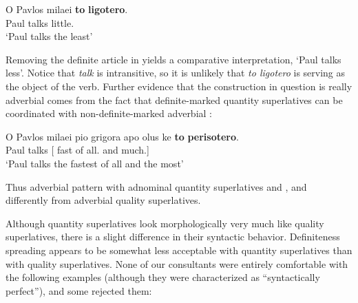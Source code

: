 \documentclass[output=paper
,modfonts
,nonflat]{langsci/langscibook}
\begin{document}
\ea \label{ex:coppockstrand:19} 
\gll O Pavlos milaei \textbf{to} \textbf{ligotero}.\\
  Paul talks   little.\cmpr{}\\
\glt `Paul talks the least'
\z

Removing the definite article in  yields a comparative interpretation, `Paul talks less'. Notice that \textit{talk} is intransitive, so it is unlikely that \textit{to ligotero} is serving as the object of the verb. Further evidence that the construction in question is really adverbial comes from the fact that definite-marked quantity superlatives can be coordinated with non-definite-marked adverbial :

\ea \label{ex:coppockstrand:20}
\gll O Pavlos milaei {\ob}pio grigora apo olus ke \textbf{to} \textbf{perisotero}{\cb}.\\
 Paul talks [\cmpr{} fast of all.\acc{} and   much.\cmpr{}]\\
\glt `Paul talks the fastest of all and the most'
\z

Thus adverbial  pattern with adnominal quantity superlatives and , and differently from adverbial quality superlatives.

Although quantity superlatives look morphologically very much like quality superlatives, there is a slight difference in their syntactic behavior.
Definiteness spreading appears to be somewhat less acceptable with quantity superlatives than with quality superlatives. None of our consultants were entirely comfortable with the following examples (although they were characterized as ``syntactically perfect''), and some rejected them:

\ea \label{ex:coppockstrand:21}
\begin{xlist}
\end{xlist}
\z
\end{document}
